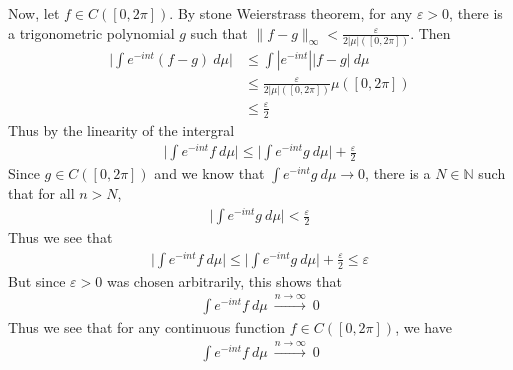 \documentclass[12pt]{exam}
\theoremstyle{plain} %
\theoremstyle{definition} %
\theoremstyle{remark} %
\begin{document}
\begin{questions}
\begin{solution}
    Now, let $f \in C([0, 2 \pi])$. By stone Weierstrass theorem, for
    any $\varepsilon > 0$,
    there is a trigonometric polynomial $g$ such that $ \|f -
    g\|_\infty < \frac{\varepsilon}{2|\mu|([0, 2 \pi])}$. Then
    \begin{align*}
      \Big|\int e^{-int} (f - g) \ d \mu \Big| & \le \int
      |e^{-int}||f - g| \ d \mu \\
      &\le \frac{\varepsilon}{2|\mu|([0, 2 \pi])} \mu([0, 2 \pi]) \\
      &\le \frac{\varepsilon}{2}
    \end{align*}
    Thus by the linearity of the intergral
    \begin{align*}
      \Big|\int e^{-int} f \ d \mu\Big| \le \Big| \int e^{-int} g \ d
      \mu\Big| + \frac{\varepsilon}{2}
    \end{align*}
    Since $g \in C([0, 2 \pi])$ and we know that $\int e^{-int} g \ d
    \mu \to 0$, there is a $N \in \mathbb{N}$ such that for all $n > N$,
    \begin{align*}
      \Big|\int e^{-int} g \ d \mu\Big| < \frac{\varepsilon}{2}
    \end{align*}
    Thus we see that
    \begin{align*}
      \Big|\int e^{-int} f \ d \mu\Big| \le \Big| \int e^{-int} g \ d
      \mu\Big| + \frac{\varepsilon}{2} \le \varepsilon
    \end{align*}
    But since $\varepsilon > 0$ was chosen arbitrarily, this shows that
    \begin{align*}
      \int e^{-int} f \ d \mu \ \stackrel{ n \to \infty}{\longrightarrow} \ 0
    \end{align*}
    Thus we see that for any continuous function $f \in C([0, 2 \pi])$, we have
    \begin{align*}
      \int e^{-int} f \ d \mu \ \stackrel{ n \to \infty}{\longrightarrow} \ 0
    \end{align*}


\end{solution}
\end{questions}
\end{document}
